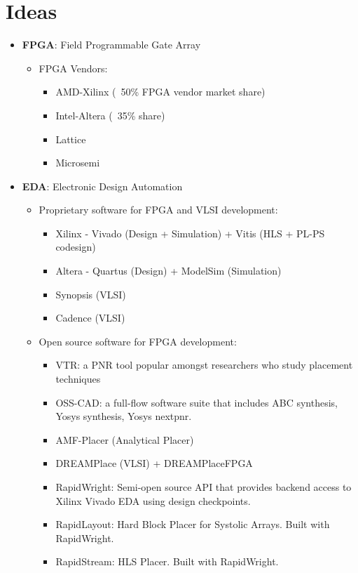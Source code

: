 \documentclass{article}
\begin{document}
\section{Ideas}
\begin{itemize}[label={\textbullet}, left=0.25cm]
    \item \textbf{FPGA}: Field Programmable Gate Array
    \begin{itemize}[label={--}, left=0.25cm]
        \item FPGA Vendors:
        \begin{itemize}[label={$\cdot$}, left=0.25cm]
            \item AMD-Xilinx (~50\% FPGA vendor market share)
            \item Intel-Altera (~35\% share)
            \item Lattice
            \item Microsemi
        \end{itemize}
    \end{itemize}

    \item \textbf{EDA}: Electronic Design Automation
    \begin{itemize}[label={--}, left=0.25cm]
        \item Proprietary software for FPGA and VLSI development:
        \begin{itemize}[label={$\cdot$}, left=0.25cm]
            \item Xilinx - Vivado (Design + Simulation) + Vitis (HLS + PL-PS codesign)
            \item Altera - Quartus (Design) + ModelSim (Simulation)
            \item Synopsis (VLSI)
            \item Cadence (VLSI)
        \end{itemize}
        \item Open source software for FPGA development:
        \begin{itemize}[label={$\cdot$}, left=0.25cm]
            \item VTR: a PNR tool popular amongst researchers who study placement techniques
            \item OSS-CAD: a full-flow software suite that includes ABC synthesis, Yosys synthesis, Yosys nextpnr.
            \item AMF-Placer (Analytical Placer)
            \item DREAMPlace (VLSI) + DREAMPlaceFPGA
            \item RapidWright: Semi-open source API that provides backend access to Xilinx Vivado EDA using design checkpoints.
            \item RapidLayout: Hard Block Placer for Systolic Arrays. Built with RapidWright.
            \item RapidStream: HLS Placer. Built with RapidWright.
        \end{itemize}
    \end{itemize}
    

\end{itemize}
\end{document}
